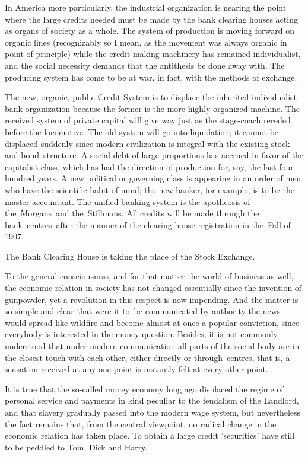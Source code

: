 \documentclass[openany,nobib]{tufte-book}
\begin{document}
In America more particularly, the industrial organization is nearing the
point where the large credits needed must be made by the bank clearing
houses acting as organs of society as a whole. The system of production
is moving forward on organic lines (recognizably so I mean, as the
movement was always organic in point of principle) while the
credit-making machinery has remained individualist, and the social
necessity demands that the antithesis be done away with. The producing
system has come to be at war, in fact, with the methods of exchange.~

The new, organic, public Credit System is to displace the inherited
individualist bank organization because the former is the more highly
organized machine. The received system of private capital will give way
just as the stage-coach receded before the locomotive. The old system
will go into liquidation; it cannot be displaced suddenly since modern
civilization is integral with the existing stock-and-bond~structure. A
social debt of large proportions has accrued in favor of the capitalist
class, which has had the direction of production for, say, the last four
hundred years. A new political or governing class is appearing in an
order of men who have the scientific habit of mind; the new banker, for
example, is to be the master accountant. The unified banking system is
the apotheosis of the~Morgans~and the~Stillmans. All credits will be
made through the bank~centres~after the manner of the clearing-house
registration in the~Fall of 1907.~

The Bank Clearing House is taking the place of the Stock Exchange.~

To the general consciousness, and for that matter the world of business
as well, the economic relation in society has not changed essentially
since the invention of gunpowder, yet a revolution in this respect is
now impending. And the matter is so simple and clear that were it to~be
communicated by authority the news would spread like wildfire and become
almost at once a popular conviction, since everybody is interested in
the money question. Besides, it is not commonly understood that under
modern communication all parts of the social body are in the closest
touch with each other, either directly or through~centres, that is, a
sensation received at any one point is instantly felt at every other
point.~

It is true that the so-called money economy long ago displaced the
regime of personal service and payments in kind peculiar to the
feudalism of the Landlord, and that slavery gradually passed into the
modern wage system, but nevertheless the fact remains that, from the
central viewpoint, no radical change in the economic relation has taken
place. To obtain a large credit 'securities' have still to be peddled to
Tom, Dick and Harry.~
\end{document}
